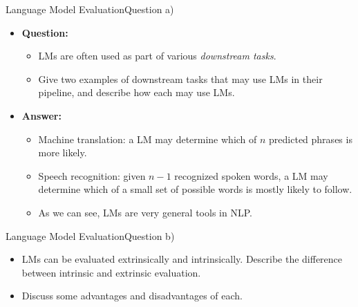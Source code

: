 \documentclass[t]{beamer}
\begin{document}
\begin{frame}{Language Model Evaluation}{Question a)}
    \begin{itemize}
        \item \textbf{Question:}
              \begin{itemize}
                  \item LMs are often used as part of various
                        \emph{downstream tasks}.
                  \item Give two examples of downstream tasks
                        that may use LMs in their pipeline, and describe how
                        each may use LMs.
              \end{itemize}
              \pause
        \item \textbf{Answer:}
              \begin{itemize}
                  \item Machine translation: a LM may determine which of $n$
                        predicted phrases is more likely.
                  \item Speech recognition: given $n-1$ recognized spoken words,
                        a LM may determine which of a small set of possible
                        words is mostly likely to follow.
                  \item As we can see, LMs are very general tools in NLP.
              \end{itemize}
    \end{itemize}
\end{frame}

\begin{frame}{Language Model Evaluation}{Question b)}
    \begin{itemize}
        \item LMs can be evaluated extrinsically and intrinsically.
              Describe the difference between intrinsic and extrinsic
              evaluation.
        \item Discuss some advantages and disadvantages of each.
    \end{itemize}
\end{frame}
\end{document}
